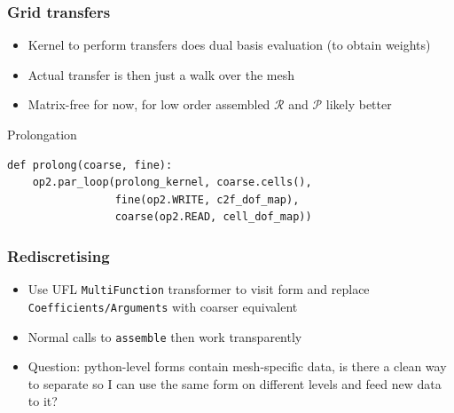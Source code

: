 \documentclass[presentation]{beamer}
\begin{document}
\begin{frame}[fragile]
  \frametitle{Grid transfers}
  \begin{itemize}
  \item Kernel to perform transfers does dual basis evaluation (to
    obtain weights)
  \item Actual transfer is then just a walk over the mesh
  \item Matrix-free for now, for low order assembled $\mathcal{R}$ and
    $\mathcal{P}$ likely better
  \end{itemize}
  \begin{block}{Prolongation}
\begin{verbatim}
def prolong(coarse, fine):
    op2.par_loop(prolong_kernel, coarse.cells(),
                 fine(op2.WRITE, c2f_dof_map),
                 coarse(op2.READ, cell_dof_map))
\end{verbatim}
  \end{block}
\end{frame}

\begin{frame}[fragile]
  \frametitle{Rediscretising}
  \begin{itemize}
  \item Use UFL \verb|MultiFunction| transformer to visit form and
    replace \verb|Coefficients/Arguments| with coarser equivalent
  \item Normal calls to \verb|assemble| then work transparently
  \item Question: python-level forms contain mesh-specific data, is
    there a clean way to separate so I can use the same form on
    different levels and feed new data to it?
  \end{itemize}
\end{frame}
\end{document}
